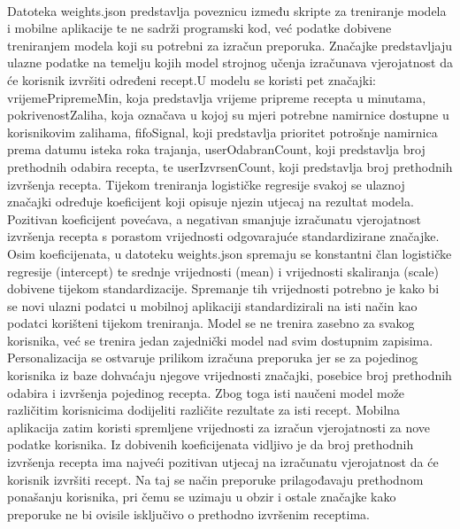 \documentclass[diplomskirad]{fer}
\begin{document}
\\ Datoteka weights.json predstavlja poveznicu između skripte za treniranje modela i mobilne aplikacije te ne sadrži programski kod, već podatke dobivene treniranjem modela koji su potrebni za izračun preporuka. Značajke predstavljaju ulazne podatke na temelju kojih model strojnog učenja izračunava vjerojatnost da će korisnik izvršiti određeni recept.U modelu se koristi pet značajki: vrijemePripremeMin, koja predstavlja vrijeme pripreme recepta u minutama, pokrivenostZaliha, koja označava u kojoj su mjeri potrebne namirnice dostupne u korisnikovim zalihama, fifoSignal, koji predstavlja prioritet potrošnje namirnica prema datumu isteka roka trajanja, userOdabranCount, koji predstavlja broj prethodnih odabira recepta, te userIzvrsenCount, koji predstavlja broj prethodnih izvršenja recepta. Tijekom treniranja logističke regresije svakoj se ulaznoj značajki određuje koeficijent koji opisuje njezin utjecaj na rezultat modela. Pozitivan koeficijent povećava, a negativan smanjuje izračunatu vjerojatnost izvršenja recepta s porastom vrijednosti odgovarajuće standardizirane značajke. Osim koeficijenata, u datoteku weights.json spremaju se konstantni član logističke regresije (intercept) te srednje vrijednosti (mean) i vrijednosti skaliranja (scale) dobivene tijekom standardizacije. Spremanje tih vrijednosti potrebno je kako bi se novi ulazni podatci u mobilnoj aplikaciji standardizirali na isti način kao podatci korišteni tijekom treniranja. Model se ne trenira zasebno za svakog korisnika, već se trenira jedan zajednički model nad svim dostupnim zapisima. Personalizacija se ostvaruje prilikom izračuna preporuka jer se za pojedinog korisnika iz baze dohvaćaju njegove vrijednosti značajki, posebice broj prethodnih odabira i izvršenja pojedinog recepta. Zbog toga isti naučeni model može različitim korisnicima dodijeliti različite rezultate za isti recept. Mobilna aplikacija zatim koristi spremljene vrijednosti za izračun vjerojatnosti za nove podatke korisnika. Iz dobivenih koeficijenata vidljivo je da broj prethodnih izvršenja recepta ima najveći pozitivan utjecaj na izračunatu vjerojatnost da će korisnik izvršiti recept. Na taj se način preporuke prilagođavaju prethodnom ponašanju korisnika, pri čemu se uzimaju u obzir i ostale značajke kako preporuke ne bi ovisile isključivo o prethodno izvršenim receptima.
\\
\end{document}
